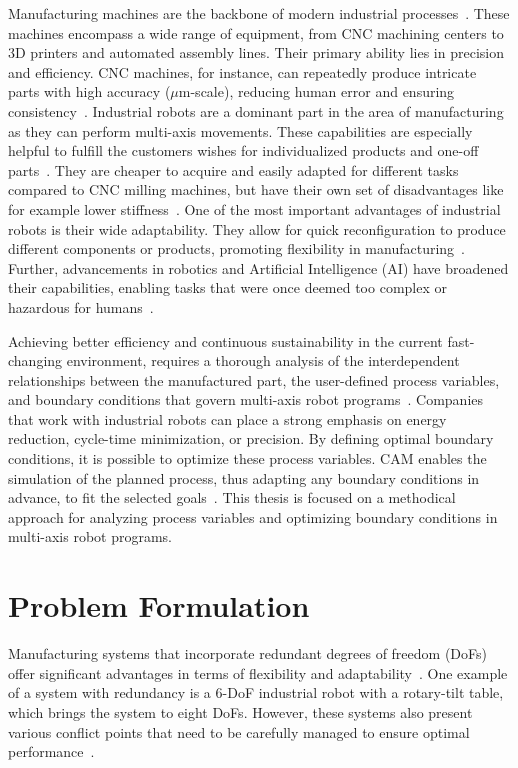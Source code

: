 Manufacturing machines are the backbone of modern industrial processes~\cite{Bi.2020}. These machines encompass a wide range of equipment, from \acrshort{CNC} machining centers to 3D printers and automated assembly lines. Their primary ability lies in precision  and efficiency. \acrshort{CNC} machines, for instance, can repeatedly produce intricate parts with high accuracy ($\mu$m-scale), reducing human error and ensuring consistency~\cite{Jia.2018,Liberman.2021}. Industrial robots are a dominant part in the area of manufacturing as they can perform multi-axis movements. These capabilities are especially helpful to fulfill the customers wishes for individualized products and one-off parts~\cite{Sherwani.2020}. They are cheaper to acquire and easily adapted for different tasks compared to \acrshort{CNC} milling machines, but have their own set of disadvantages like for example lower stiffness~\cite{Iglesias.2015, Liberman.2021}. One of the most important advantages of industrial robots is their wide adaptability. They allow for quick reconfiguration to produce different components or products, promoting flexibility in manufacturing~\cite{Billard.2019}. Further, advancements in robotics and Artificial Intelligence (\acrshort{AI}) have broadened their capabilities, enabling tasks that were once deemed too complex or hazardous for humans~\cite{Goel.2020}. 

Achieving better efficiency and continuous sustainability in the current fast-changing environment, requires a thorough analysis of the interdependent relationships between the manufactured part, the user-defined process variables, and boundary conditions that govern multi-axis robot programs~\cite{Pan, Gadaleta.2019}. Companies that work with industrial robots can place a strong emphasis on energy reduction, cycle-time minimization, or precision. By defining optimal boundary conditions, it is possible to optimize these process variables. \acrshort{CAM} enables the simulation of the planned process, thus adapting any boundary conditions in advance, to fit the selected goals~\cite{Kyratsis.2020,Maiti.2017,Pan,Uhlmann.2016}.
This thesis is focused on a methodical approach for analyzing process variables and optimizing boundary conditions in multi-axis robot programs. 

\section{Problem Formulation}\label{Problem Formulation}
Manufacturing systems that incorporate redundant degrees of freedom (\acrshort{DoF}s) offer significant advantages in terms of flexibility and adaptability~\cite{Anjum.2022}. One example of a system with redundancy is a 6-\acrshort{DoF} industrial robot with a rotary-tilt table, which brings the system to eight \acrshort{DoF}s. However, these systems also present various conflict points that need to be carefully managed to ensure optimal performance~\cite{Boscariol.2020}.


